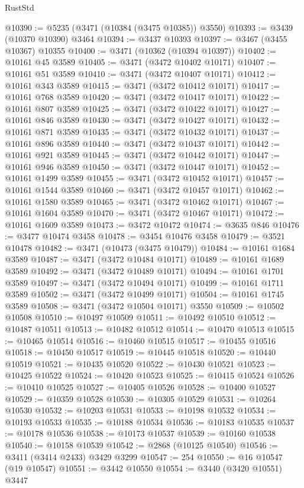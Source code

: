 \begin{lexlean}{RustStd}
\begin{coremodule}
{{{{{{{{{{{{{{{{{{{@10390 := @5235 (@3471 (@10384 (@3475 @10385)) @3550)
@10393 := @3439 (@10370 @10390) @3464
@10394 := @3437 @10393
@10397 := @3467 (@3455 @10367) @10355
@10400 := @3471 (@10362 (@10394 @10397))
@10402 := @10161 @45 @3589
@10405 := @3471 (@3472 @10402 @10171)
@10407 := @10161 @51 @3589
@10410 := @3471 (@3472 @10407 @10171)
@10412 := @10161 @343 @3589
@10415 := @3471 (@3472 @10412 @10171)
@10417 := @10161 @768 @3589
@10420 := @3471 (@3472 @10417 @10171)
@10422 := @10161 @807 @3589
@10425 := @3471 (@3472 @10422 @10171)
@10427 := @10161 @846 @3589
@10430 := @3471 (@3472 @10427 @10171)
@10432 := @10161 @871 @3589
@10435 := @3471 (@3472 @10432 @10171)
@10437 := @10161 @896 @3589
@10440 := @3471 (@3472 @10437 @10171)
@10442 := @10161 @921 @3589
@10445 := @3471 (@3472 @10442 @10171)
@10447 := @10161 @946 @3589
@10450 := @3471 (@3472 @10447 @10171)
@10452 := @10161 @1499 @3589
@10455 := @3471 (@3472 @10452 @10171)
@10457 := @10161 @1544 @3589
@10460 := @3471 (@3472 @10457 @10171)
@10462 := @10161 @1580 @3589
@10465 := @3471 (@3472 @10462 @10171)
@10467 := @10161 @1604 @3589
@10470 := @3471 (@3472 @10467 @10171)
@10472 := @10161 @1609 @3589
@10473 := @3472 @10472
@10474 := @3635 @846
@10476 := @3477 @10474 @3458
@10478 := @3454 @10476 @3458
@10479 := @3521 @10478
@10482 := @3471 (@10473 (@3475 @10479))
@10484 := @10161 @1684 @3589
@10487 := @3471 (@3472 @10484 @10171)
@10489 := @10161 @1689 @3589
@10492 := @3471 (@3472 @10489 @10171)
@10494 := @10161 @1701 @3589
@10497 := @3471 (@3472 @10494 @10171)
@10499 := @10161 @1711 @3589
@10502 := @3471 (@3472 @10499 @10171)
@10504 := @10161 @1745 @3589
@10508 := @3471 (@3472 @10504 @10171) @3550
@10509 := @10502 @10508
@10510 := @10497 @10509
@10511 := @10492 @10510
@10512 := @10487 @10511
@10513 := @10482 @10512
@10514 := @10470 @10513
@10515 := @10465 @10514
@10516 := @10460 @10515
@10517 := @10455 @10516
@10518 := @10450 @10517
@10519 := @10445 @10518
@10520 := @10440 @10519
@10521 := @10435 @10520
@10522 := @10430 @10521
@10523 := @10425 @10522
@10524 := @10420 @10523
@10525 := @10415 @10524
@10526 := @10410 @10525
@10527 := @10405 @10526
@10528 := @10400 @10527
@10529 := @10359 @10528
@10530 := @10305 @10529
@10531 := @10264 @10530
@10532 := @10203 @10531
@10533 := @10198 @10532
@10534 := @10193 @10533
@10535 := @10188 @10534
@10536 := @10183 @10535
@10537 := @10178 @10536
@10538 := @10173 @10537
@10539 := @10160 @10538
@10540 := @10158 @10539
@10542 := @2868 (@10125 @10540)
@10546 := @3411 (@3414 @2433) @3429 @3299
@10547 := 254
@10550 := @16 @10547 (@19 @10547)
@10551 := @3442 @10550
@10554 := @3440 (@3420 @10551) @3447
}}}}}}}}}}}}}}}}}}}
\end{coremodule}
\end{lexlean}
